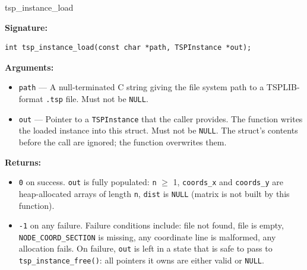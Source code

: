 \newpage

\begin{apispec}{tsp\_instance\_load}

\textbf{Signature:}
\begin{lstlisting}[style=cstyle, numbers=none]
int tsp_instance_load(const char *path, TSPInstance *out);
\end{lstlisting}

\textbf{Arguments:}
\begin{itemize}
  \item \texttt{path} --- A null-terminated C string giving the file system path to a TSPLIB-format \texttt{.tsp} file. Must not be \texttt{NULL}.
  \item \texttt{out} --- Pointer to a \texttt{TSPInstance} that the caller provides. The function writes the loaded instance into this struct. Must not be \texttt{NULL}. The struct's contents before the call are ignored; the function overwrites them.
\end{itemize}

\textbf{Returns:}
\begin{itemize}
  \item \texttt{0} on success. \texttt{out} is fully populated: \texttt{n} $\geq$ 1, \texttt{coords\_x} and \texttt{coords\_y} are heap-allocated arrays of length \texttt{n}, \texttt{dist} is \texttt{NULL} (matrix is not built by this function).
  \item \texttt{-1} on any failure. Failure conditions include: file not found, file is empty, \texttt{NODE\_COORD\_SECTION} is missing, any coordinate line is malformed, any allocation fails. On failure, \texttt{out} is left in a state that is safe to pass to \texttt{tsp\_instance\_free()}: all pointers it owns are either valid or \texttt{NULL}.
\end{itemize}


\end{apispec}
